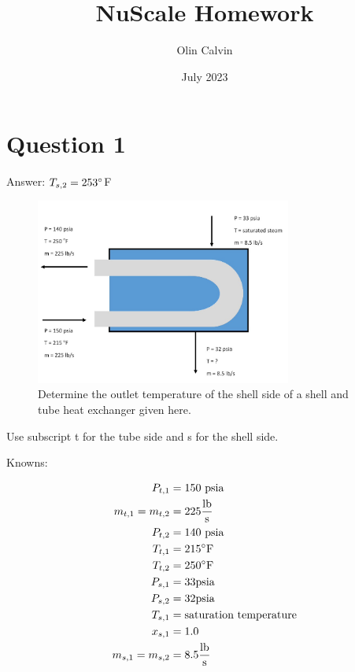 \documentclass{article}
\title{NuScale Homework}
\author{Olin Calvin}
\date{July 2023}
\begin{document}
\maketitle

\section{Question 1}

Answer: $T_{s,2} = 253 \degree$F

\begin{figure}[htbp]
    \centering
    \includegraphics[width=0.75\textwidth]{question_1_picture.png}
    \caption{Determine the outlet temperature of the shell side of a shell and tube heat exchanger given here.}
    \label{fig:question_1_fig}
\end{figure}

Use subscript t for the tube side and s for the shell side.

Knowns:

\begin{align*}
    P_{t,1} &= 150 \text{ psia} \\
    m_{t,1} = m_{t,2} &= 225 \frac{\text{lb}}{\text{s}} \\
    P_{t,2} &= 140 \text{ psia} \\
    T_{t,1} &= 215 \degree \text{F} \\
    T_{t,2} &= 250 \degree \text{F} \\
    P_{s,1} &= 33 \text{psia} \\
    P_{s,2} &= 32 \text{psia} \\
    T_{s,1} &= \text{saturation temperature} \\
    x_{s,1} &= 1.0 \\
    m_{s,1} = m_{s,2} &= 8.5 \frac{\text{lb}}{\text{s}}
\end{align*}
\end{document}
